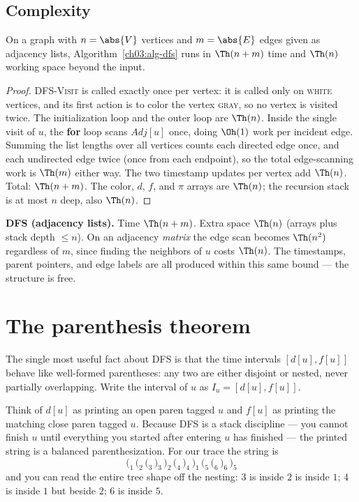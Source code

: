 \subsection{Complexity}

\begin{theorem}\label{ch03:thm-linear}
On a graph with $n=\abs{V}$ vertices and $m=\abs{E}$ edges given as adjacency lists, Algorithm~\ref{ch03:alg-dfs} runs in $\Th(n+m)$ time and $\Th(n)$ working space beyond the input.
\end{theorem}

\begin{proof}
\textsc{DFS-Visit} is called exactly once per vertex: it is called only on \textsc{white} vertices, and its first action is to color the vertex \textsc{gray}, so no vertex is visited twice. The initialization loop and the outer loop are $\Th(n)$. Inside the single visit of $u$, the \textbf{for} loop scans $\mathit{Adj}[u]$ once, doing $\Oh(1)$ work per incident edge. Summing the list lengths over all vertices counts each directed edge once, and each undirected edge twice (once from each endpoint), so the total edge-scanning work is $\Th(m)$ either way. The two timestamp updates per vertex add $\Th(n)$. Total: $\Th(n+m)$. The color, $d$, $f$, and $\pi$ arrays are $\Th(n)$; the recursion stack is at most $n$ deep, also $\Th(n)$.
\end{proof}

\begin{complexitybox}
\textbf{DFS (adjacency lists).} Time $\Th(n+m)$. Extra space $\Th(n)$ (arrays plus stack depth $\le n$). On an adjacency \emph{matrix} the edge scan becomes $\Th(n^2)$ regardless of $m$, since finding the neighbors of $u$ costs $\Th(n)$. The timestamps, parent pointers, and edge labels are all produced within this same bound --- the structure is free.
\end{complexitybox}

\section{The parenthesis theorem}
\label{ch03:parenthesis}

The single most useful fact about DFS is that the time intervals $[d[u],f[u]]$ behave like well-formed parentheses: any two are either disjoint or nested, never partially overlapping. Write the interval of $u$ as $I_u=[d[u],f[u]]$.

\begin{intuitionbox}
Think of $d[u]$ as printing an open paren tagged $u$ and $f[u]$ as printing the matching close paren tagged $u$. Because DFS is a stack discipline --- you cannot finish $u$ until everything you started after entering $u$ has finished --- the printed string is a balanced parenthesization. For our trace the string is
\[
\texttt{(}_1\,\texttt{(}_2\,\texttt{(}_3\,\texttt{)}_3\,\texttt{)}_2\,\texttt{(}_4\,\texttt{)}_4\,\texttt{)}_1\,\texttt{(}_5\,\texttt{(}_6\,\texttt{)}_6\,\texttt{)}_5
\]
and you can read the entire tree shape off the nesting: $3$ is inside $2$ is inside $1$; $4$ is inside $1$ but beside $2$; $6$ is inside $5$.
\end{intuitionbox}

